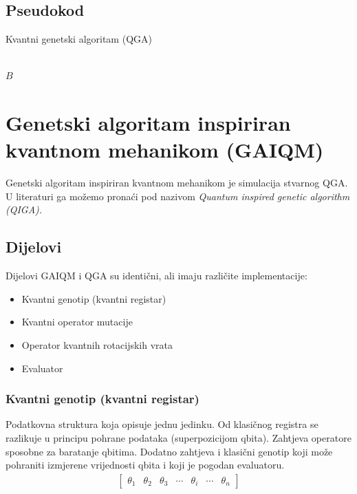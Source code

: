 \documentclass[times, utf8, zavrsni]{fer}
\begin{document}
\subsection{Pseudokod}
\begin{algorithm}
\caption{Kvantni genetski algoritam (QGA)}
\label{algo:qga}
\begin{algorithmic}
\\
\ENDWHILE
\RETURN $B$
\end{algorithmic}
\end{algorithm}

\section{Genetski algoritam inspiriran kvantnom mehanikom (GAIQM)}
Genetski algoritam inspiriran kvantnom mehanikom je simulacija stvarnog QGA. U literaturi ga možemo pronaći pod nazivom \it Quantum inspired genetic algorithm (QIGA)\rm.

\subsection{Dijelovi}
Dijelovi GAIQM i QGA su identični, ali imaju različite implementacije:
\begin{itemize}
\item Kvantni genotip (kvantni registar)
\item Kvantni operator mutacije
\item Operator kvantnih rotacijskih vrata
\item Evaluator
\end{itemize}

\subsubsection{Kvantni genotip (kvantni registar)}
Podatkovna struktura koja opisuje jednu jedinku. Od klasičnog registra se razlikuje u principu pohrane podataka (superpozicijom qbita). Zahtjeva operatore sposobne za baratanje qbitima. Dodatno zahtjeva i klasični genotip koji može pohraniti izmjerene vrijednosti qbita i koji je pogodan evaluatoru.
\begin{align*}
\begin{bmatrix}
\theta_1 & \theta_2 & \theta_3 & \cdots & \theta_i & \cdots & \theta_n
\end{bmatrix}
\end{align*}
\end{document}
